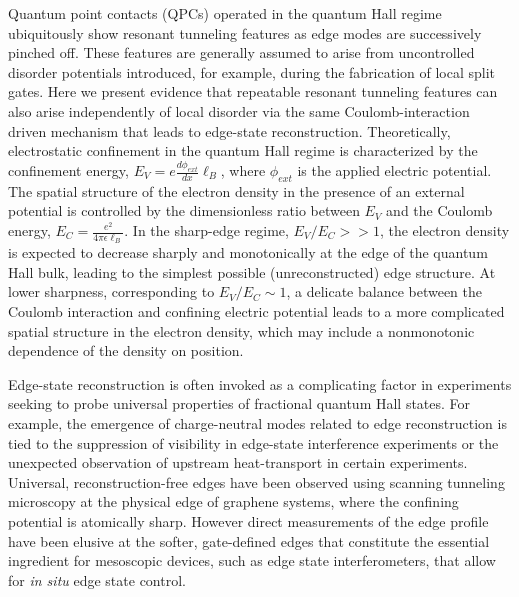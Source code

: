 \documentclass[reprint,prl,aps,superscriptaddress]{revtex4-1}
\begin{document}
Quantum point contacts (QPCs) operated in the quantum Hall regime ubiquitously show resonant tunneling features as edge modes are successively pinched off. These features are generally assumed to arise from uncontrolled disorder potentials introduced, for example, during the fabrication of local split gates\cite{baer_interplay_2014, milliken_indications_1996, deprez_tunable_2021, zimmermann_tunable_2017, ronen_aharonov-bohm_2021}. 
Here we present evidence that repeatable resonant tunneling features can also arise independently of local disorder via the same Coulomb-interaction driven mechanism that leads to edge-state reconstruction\cite{chamon_sharp_1994}.  
Theoretically, electrostatic confinement in the  quantum Hall regime is characterized by the confinement energy, $E_V = e\frac{d\phi_{ext}}{dx}\ell_B$, where $\phi_{ext}$ is the applied electric potential. 
 The spatial structure of the electron density in the presence of an external potential is controlled by the dimensionless ratio between $E_V$ and the Coulomb energy, $E_C = \frac{e^2}{4\pi \epsilon \ell_B}$. In the sharp-edge regime, $E_V/E_C >> 1$, the electron density is expected to decrease sharply and monotonically at the edge of the quantum Hall bulk, leading to the simplest possible (unreconstructed) edge structure. At lower sharpness, corresponding to $E_V/E_C \sim 1$, a delicate balance between the Coulomb interaction and confining electric potential leads to a more complicated spatial structure in the electron density, which may include a nonmonotonic dependence of the density on position.  
 
Edge-state reconstruction is often invoked as a complicating factor in experiments seeking to probe universal properties of fractional quantum Hall states. 
For example, the emergence of charge-neutral modes related to edge reconstruction is tied to the suppression of visibility in edge-state interference experiments\cite{bhattacharyya_melting_2019} or the unexpected observation of upstream heat-transport in certain experiments\cite{sabo_edge_2017,venkatachalam_local_2012}.  
Universal, reconstruction-free edges\cite{hu_realizing_2011} have been observed using scanning tunneling microscopy at the physical edge of graphene systems\cite{li_evolution_2013,coissard_absence_2023}, where the confining potential is atomically sharp.  
However direct measurements of the edge profile have been elusive at the softer, gate-defined edges that constitute the essential ingredient for mesoscopic devices, such as edge state interferometers, that allow for \textit{in situ}  edge state control.
\end{document}
